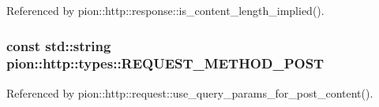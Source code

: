Referenced by pion\-::http\-::response\-::is\-\_\-content\-\_\-length\-\_\-implied().

\hypertarget{structpion_1_1http_1_1types_a31458141c7a1704b8e24fbfaa0f92e6c}{
\subsubsection[{R\-E\-Q\-U\-E\-S\-T\-\_\-\-M\-E\-T\-H\-O\-D\-\_\-\-P\-O\-S\-T}]{\setlength{\rightskip}{0pt plus 5cm}const std\-::string pion\-::http\-::types\-::\-R\-E\-Q\-U\-E\-S\-T\-\_\-\-M\-E\-T\-H\-O\-D\-\_\-\-P\-O\-S\-T\hspace{0.3cm}{\ttfamily [static]}}}\label{structpion_1_1http_1_1types_a31458141c7a1704b8e24fbfaa0f92e6c}


Referenced by pion\-::http\-::request\-::use\-\_\-query\-\_\-params\-\_\-for\-\_\-post\-\_\-content().

